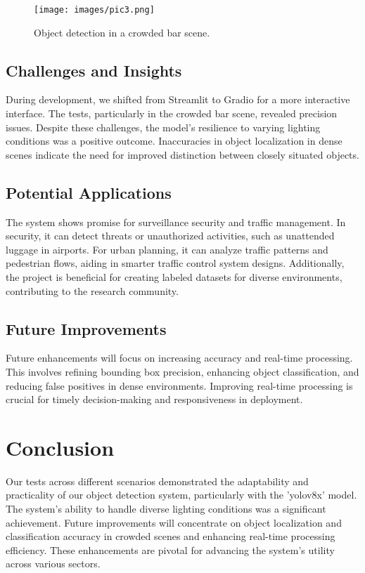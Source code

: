 \documentclass[10pt]{extarticle}
\begin{document}
\begin{figure}[H]
\centering
\texttt{[image: images/pic3.png]}
\caption{Object detection in a crowded bar scene.}
\end{figure}

\subsection{Challenges and Insights}
During development, we shifted from Streamlit to Gradio for a more interactive interface. The tests, particularly in the crowded bar scene, revealed precision issues. Despite these challenges, the model's resilience to varying lighting conditions was a positive outcome. Inaccuracies in object localization in dense scenes indicate the need for improved distinction between closely situated objects.

\subsection{Potential Applications}
The system shows promise for surveillance security and traffic management. In security, it can detect threats or unauthorized activities, such as unattended luggage in airports. For urban planning, it can analyze traffic patterns and pedestrian flows, aiding in smarter traffic control system designs. Additionally, the project is beneficial for creating labeled datasets for diverse environments, contributing to the research community.

\subsection{Future Improvements}
Future enhancements will focus on increasing accuracy and real-time processing. This involves refining bounding box precision, enhancing object classification, and reducing false positives in dense environments. Improving real-time processing is crucial for timely decision-making and responsiveness in deployment.

\section{Conclusion}
Our tests across different scenarios demonstrated the adaptability and practicality of our object detection system, particularly with the 'yolov8x' model. The system's ability to handle diverse lighting conditions was a significant achievement. Future improvements will concentrate on object localization and classification accuracy in crowded scenes and enhancing real-time processing efficiency. These enhancements are pivotal for advancing the system's utility across various sectors.
\end{document}
